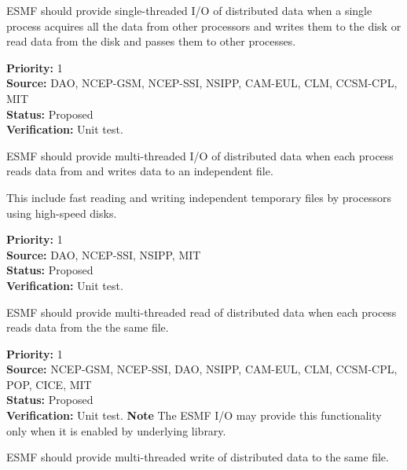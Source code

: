


ESMF should provide single-threaded I/O of distributed data when a
single process acquires all the data from other processors and writes
them to the disk or read data from the disk and passes them to other 
processes. 


\begin{reqlist}
{\bf Priority:} 1 \\
{\bf Source:} DAO, NCEP-GSM, NCEP-SSI, NSIPP, CAM-EUL, CLM, CCSM-CPL, MIT \\
{\bf Status:} Proposed \\
{\bf Verification:} Unit test.
\end{reqlist}




ESMF should provide multi-threaded I/O of distributed data when each
process reads data from and writes data to an independent file. 

This include fast reading and writing independent temporary files by 
processors using high-speed disks.

\begin{reqlist}
{\bf Priority:} 1 \\
{\bf Source:} DAO, NCEP-SSI, NSIPP, MIT \\
{\bf Status:} Proposed \\
{\bf Verification:} Unit test.
\end{reqlist}




ESMF should provide multi-threaded read of distributed data when each
process reads data from the the same file.  

\begin{reqlist}
{\bf Priority:} 1 \\
{\bf Source:} NCEP-GSM, NCEP-SSI, DAO, NSIPP, CAM-EUL, CLM, CCSM-CPL, POP, CICE, MIT \\
{\bf Status:} Proposed \\
{\bf Verification:} Unit test.
{\bf Note} The ESMF I/O may provide this functionality only when it is 
enabled by underlying library. 
\end{reqlist}




ESMF should provide multi-threaded write of distributed data to the same 
file.  


